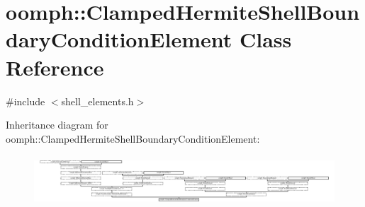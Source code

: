 \hypertarget{classoomph_1_1ClampedHermiteShellBoundaryConditionElement}{}\section{oomph\+:\+:Clamped\+Hermite\+Shell\+Boundary\+Condition\+Element Class Reference}
\label{classoomph_1_1ClampedHermiteShellBoundaryConditionElement}


{\ttfamily \#include $<$shell\+\_\+elements.\+h$>$}

Inheritance diagram for oomph\+:\+:Clamped\+Hermite\+Shell\+Boundary\+Condition\+Element\+:\begin{figure}[H]
\begin{center}
\leavevmode
\includegraphics[height=1.910448cm]{classoomph_1_1ClampedHermiteShellBoundaryConditionElement}
\end{center}
\end{figure}
